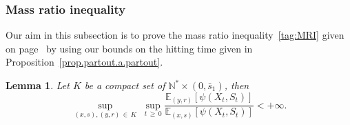 \documentclass[10pt]{amsart}
\newtheorem{lemm}[theo]{Lemma}\newtheorem{prop}[theo]{Proposition}\newtheorem{coro}[theo]{Corollary}\newtheorem{conj}[theo]{Conjecture}
\theoremstyle{definition}\newtheorem{defi}[theo]{Definition}\newtheorem{rema}[theo]{Remark}\newtheorem{exam}[theo]{Example}\newtheorem{exem}[theo]{Example}\newtheorem{nota}[theo]{Notation}
\newcommand{\NN}{\mathbb{N}}
\newcommand{\EE}{\mathbb{E}}
\newcommand{\1}{\mathbf{1}}
\begin{document}
\subsubsection{Mass ratio inequality}\label{sec:mass.ratio}

Our aim in this subsection is to prove the mass ratio inequality~\eqref{tag:MRI} given on page~\pageref{tag:MRI} by using our bounds on the hitting time given in Proposition~\ref{prop.partout.a.partout}.

\begin{lemm}\label{lem:ratio}
Let $K$ be a compact set of $\NN^*\times (0,\bar s_1)$, then
\[
\sup_{(x,s),(y,r)\,\in \,K}\; \sup_{t\,\geq\,0} \frac{\EE_{(y,r)} \left[\psi (X_{t}, S_{t})\right]}{\EE_{(x,s)} \left[\psi (X_{t}, S_{t})\right]} <+ \infty.
\]
\end{lemm}
\end{document}
